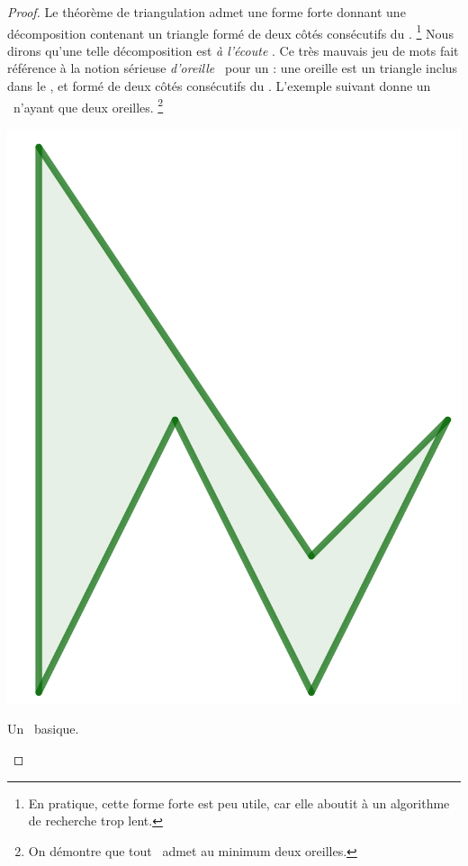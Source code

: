 \begin{proof}
    Le théorème de triangulation admet une forme forte donnant une décomposition contenant un triangle formé de deux côtés consécutifs du \ngone.%
    \footnote{
        En pratique, cette forme forte est peu utile, car elle aboutit à un algorithme de recherche trop lent.
    }
    Nous dirons qu'une telle décomposition est \og \emph{à l'écoute} \fg.
    Ce très mauvais jeu de mots fait référence à la notion sérieuse \og \emph{d'oreille} \fg\ pour un \ngone: une oreille est un triangle inclus dans le \ngone, et formé de deux côtés consécutifs du \ngone.
    L'exemple suivant donne un \ngone\ n'ayant que deux oreilles.%
    \footnote{
        On démontre que tout \ngone\ admet au minimum deux oreilles.
    }


    \begin{multicols}{2}
        \small\itshape
    	\begin{center}
        	\includegraphics[scale=.4]{content/polygon/alg-area/mini-ear-1.png}

        	\smallskip
       		Un \ngone\ basique.
    	\end{center}


\end{multicols}
\end{proof}
